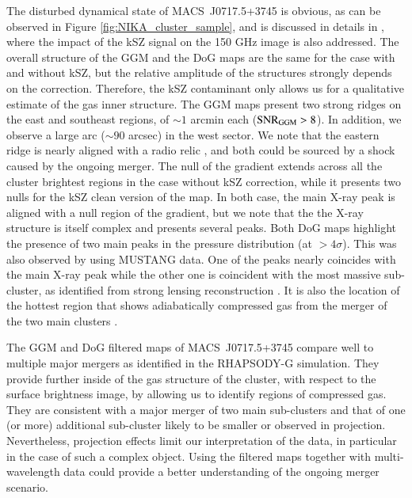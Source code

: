 \documentclass[twocolumn,traditabstract]{aa}
\begin{document}
The disturbed dynamical state of \mbox{MACS~J0717.5+3745} is obvious, as can be observed in Figure \ref{fig:NIKA_cluster_sample}, and is discussed in details in \cite{Adam2016b}, where the impact of the kSZ signal on the 150 GHz image is also addressed. The overall structure of the GGM and the DoG maps are the same for the case with and without kSZ, but the relative amplitude of the structures strongly depends on the correction. Therefore, the kSZ contaminant only allows us for a qualitative estimate of the gas inner structure. The GGM maps present two strong ridges on the east and southeast regions, of $\sim 1$ arcmin each (${\rm SNR}_{\rm GGM} > 8$). In addition, we observe a large arc ($\sim 90$ arcsec) in the west sector. We note that the eastern ridge is nearly aligned with a radio relic \citep[see, e.g.,][]{vanWeeren2017}, and both could be sourced by a shock caused by the ongoing merger. The null of the gradient extends across all the cluster brightest regions in the case without kSZ correction, while it presents two nulls for the kSZ clean version of the map. In both case, the main X-ray peak is aligned with a null region of the gradient, but we note that the the X-ray structure is itself complex and presents several peaks. Both DoG maps highlight the presence of two main peaks in the pressure distribution (at $> 4 \sigma$). This was also observed by \cite{Mroczkowski2012} using MUSTANG data. One of the peaks nearly coincides with the main X-ray peak while the other one is coincident with the most massive sub-cluster, as identified from strong lensing reconstruction \citep[e.g.,][]{Limousin2015}. It is also the location of the hottest region that shows adiabatically compressed gas from the merger of the two main clusters \citep[see][]{Adam2016b}.

The GGM and DoG filtered maps of \mbox{MACS~J0717.5+3745} compare well to multiple major mergers as identified in the RHAPSODY-G simulation. They provide further inside of the gas structure of the cluster, with respect to the surface brightness image, by allowing us to identify regions of compressed gas. They are consistent with a major merger of two main sub-clusters and that of one (or more) additional sub-cluster likely to be smaller or observed in projection. Nevertheless, projection effects limit our interpretation of the data, in particular in the case of such a complex object. Using the filtered maps together with multi-wavelength data could provide a better understanding of the ongoing merger scenario.

\end{document}
